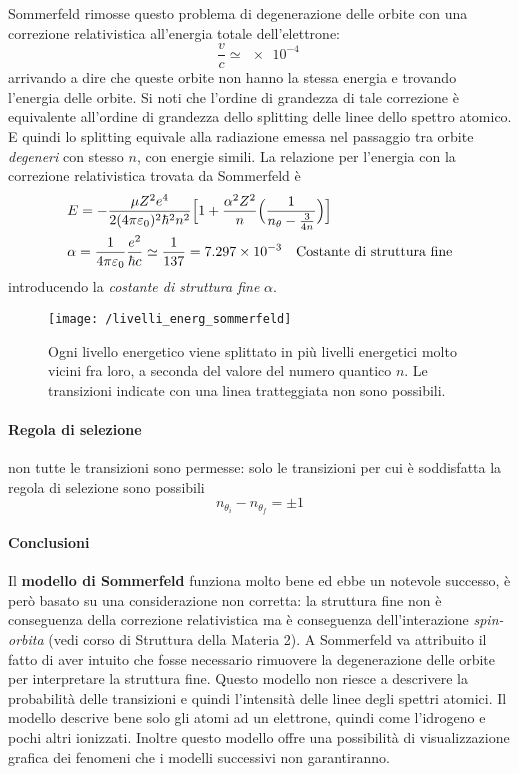 Sommerfeld rimosse questo problema di degenerazione delle orbite con una correzione relativistica all'energia totale dell'elettrone:
\begin{equation}
\frac{ v}{ c} \simeq \SI{e-4}{}
\end{equation}
arrivando a dire che queste orbite non hanno la stessa energia e trovando l'energia delle orbite.
Si noti che l'ordine di grandezza di tale correzione è equivalente all'ordine di grandezza dello splitting delle linee dello spettro atomico.
E quindi lo splitting equivale alla radiazione emessa nel passaggio tra orbite \textit{degeneri} con stesso $n$, con energie simili.
La relazione per l'energia con la correzione relativistica trovata da Sommerfeld è
\begin{equation}
\begin{split}
& E = - \frac{ \mu Z^2 e^4}{2 (4\pi\varepsilon_0)^2 \hbar^2 n^2 } \Bigl[ 1 + \frac{ \alpha^2 Z^2}{n } \Bigl(  \frac{ 1}{n_{\theta} - \frac{ 3}{4 n } }  \Bigr) \Bigr] \\
& \alpha = \frac{ 1}{4\pi\varepsilon_0 } \frac{ e^2}{\hbar c } \simeq \frac{ 1}{137 } = \SI{7.297e-3}{} \quad \mbox{Costante di struttura fine}
\end{split}
\end{equation}
introducendo la \textit{costante di struttura fine} $\alpha$.
\begin{figure}[h]
\centering
\texttt{[image: /livelli\_energ\_sommerfeld]}
\caption{Ogni livello energetico viene splittato in più livelli energetici molto vicini fra loro, a seconda del valore del numero quantico $n$. Le transizioni indicate con una linea tratteggiata non sono possibili.}
\end{figure}

\paragraph{Regola di selezione} non tutte le transizioni sono permesse: solo le transizioni per cui è soddisfatta la regola di selezione sono possibili
\begin{equation}
n_{\theta_i} - n_{\theta_f} = \pm 1
\end{equation}

\paragraph{Conclusioni} Il \textbf{modello di Sommerfeld} funziona molto bene ed ebbe un notevole successo, è però basato su una considerazione non corretta: la struttura fine non è conseguenza della correzione relativistica ma è conseguenza dell'interazione \textit{spin-orbita} (vedi corso di Struttura della Materia 2).
A Sommerfeld va attribuito il fatto di aver intuito che fosse necessario rimuovere la degenerazione delle orbite per interpretare la struttura fine.
Questo modello non riesce a descrivere la probabilità delle transizioni e quindi l'intensità delle linee degli spettri atomici.
Il modello descrive bene solo gli atomi ad un elettrone, quindi come l'idrogeno e pochi altri ionizzati.
Inoltre questo modello offre una possibilità di visualizzazione grafica dei fenomeni che i modelli successivi non garantiranno.

